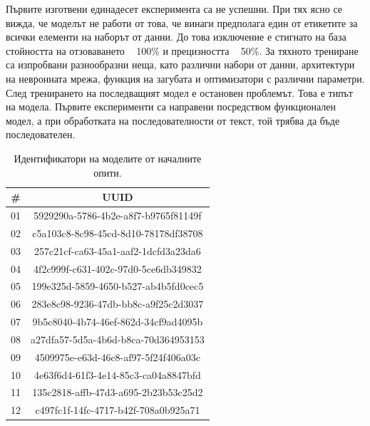 \documentclass{article}
\begin{document}
Първите изготвени единадесет експеримента са не успешни. При тях ясно се вижда, че моделът не работи от това, че винаги
предполага един от етикетите за всички елементи на наборът от данни. До това изключение е стигнато на база стойността
на отзоваването ~ 100\% и прецизността ~ 50\%. За тяхното трениране са изпробвани разнообразни неща, като различни
набори от данни, архитектури на невронната мрежа, функция на загубата и оптимизатори с различни параметри. След
тренирането на последващият модел е остановен проблемът. Това е типът на модела. Първите експерименти са направени
посредством функционален модел, а при обработката на последователности от текст, той трябва да бъде последователен.

\begin{table}[H]
\centering
\captionsetup{justification=centering}
\begin{tabular}{|c||c|}
\hline
\# & UUID\\
\hline
01 & 5929290a-5786-4b2e-a8f7-b9765f81149f\\
02 & c5a103c8-8c98-45cd-8d10-78178df38708\\
03 & 257c21cf-ca63-45a1-aaf2-1dcfd3a23da6\\
04 & 4f2c999f-c631-402c-97d0-5ce6db349832\\
05 & 199e325d-5859-4650-b527-ab4b5fd0cec5\\
06 & 283e8c98-9236-47db-bb8c-a9f25c2d3037\\
07 & 9b5c8040-4b74-46ef-862d-34cf9ad4095b\\
08 & a27dfa57-5d5a-4b6d-b8ca-70d364953153\\
09 & 4509975e-e63d-46c8-af97-5f24f406a03c\\
10 & 4e63f6d4-61f3-4e14-85c3-ca04a8847bfd\\
11 & 135c2818-affb-47d3-a695-2b23b53c25d2\\
12 & c497fc1f-14fc-4717-b42f-708a0b925a71\\
\hline
\end{tabular}
\caption{Идентификатори на моделите от началните опити.}
\end{table}
\end{document}
